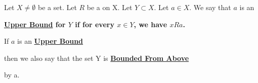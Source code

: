 \label{def:UpperBound}
\newcommand{\UpperBound}[0]{
    \bf \hyperref[def:UpperBound]{Upper Bound} \rm
}

\newcommand{\BoundedFromAbove}[0]{
    \bf \hyperref[def:UpperBound]{Bounded From Above} \rm
}

\begin{df}
    Let $X \neq \emptyset$ be a set. 
    Let $R$ be a \Relation on X. 
    Let $Y \subset X$.
    Let $a \in X$. 
    We say that $a$ is an 
    \UpperBound for $Y$ if
    for every $x \in Y$, 
    we have $x R a$. 
    
    If $a$ is an \UpperBound
    then we also say that 
    the set Y is \BoundedFromAbove
    by a. 
\end{df}